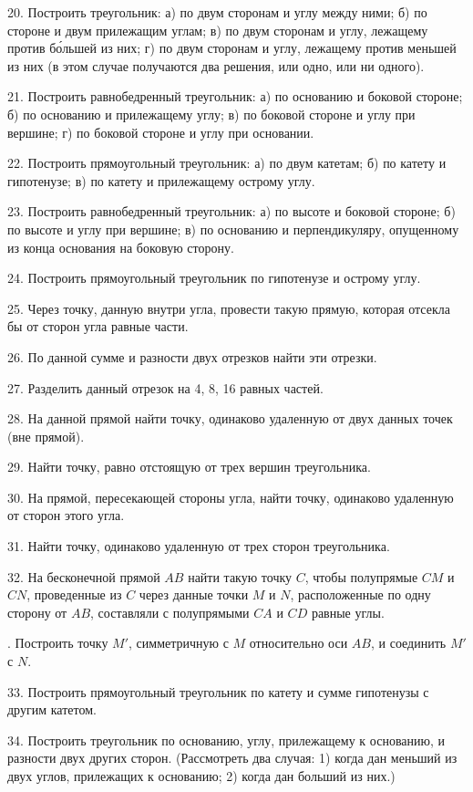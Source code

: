 \documentclass[oneside]{book}
\begin{document}
20.
Построить треугольник:
а) по двум сторонам и углу между ними;
б) по стороне и двум прилежащим углам;
в) по двум сторонам и углу, лежащему против б\'{о}льшей из них;
г) по двум сторонам и углу, лежащему против меньшей из них (в этом случае получаются два решения, или одно, или ни одного).

21.
Построить равнобедренный треугольник:
а) по основанию и боковой стороне;
б) по основанию и прилежащему углу;
в) по боковой стороне и углу при вершине;
г) по боковой стороне и углу при основании.

22.
Построить прямоугольный треугольник:
а) по двум катетам;
б) по катету и гипотенузе;
в) по катету и прилежащему острому углу.

23.
Построить равнобедренный треугольник:
а) по высоте и боковой стороне;
б) по высоте и углу при вершине;
в) по основанию и перпендикуляру, опущенному из конца основания на боковую сторону.

24.
Построить прямоугольный треугольник по гипотенузе и острому углу.

25.
Через точку, данную внутри угла, провести такую прямую, которая отсекла бы от сторон угла равные части.

26.
По данной сумме и разности двух отрезков найти эти отрезки.

27.
Разделить данный отрезок на 4, 8, 16 равных частей.

28.
На данной прямой найти точку, одинаково удаленную от двух данных точек (вне прямой).

29.
Найти точку, равно отстоящую от трех вершин треугольника.

30.
На прямой, пересекающей стороны угла, найти точку, одинаково удаленную от сторон этого угла.

31.
Найти точку, одинаково удаленную от трех сторон треугольника.

32.
На бесконечной прямой $AB$ найти такую точку $C$, чтобы полупрямые $CM$ и $CN$, проведенные из $C$ через данные точки $M$ и $N$, расположенные по одну сторону от $AB$, составляли с полупрямыми $CA$ и $CD$ равные углы.

.
Построить точку $M'$, симметричную с $M$ относительно оси $AB$, и соединить $M'$ с $N$.

33.
Построить прямоугольный треугольник по катету и сумме гипотенузы с другим катетом.

34.
Построить треугольник по основанию, углу, прилежащему к основанию, и разности двух других сторон.
(Рассмотреть два случая:
1) когда дан меньший из двух углов, прилежащих к основанию;
2) когда дан больший из них.)
\end{document}
